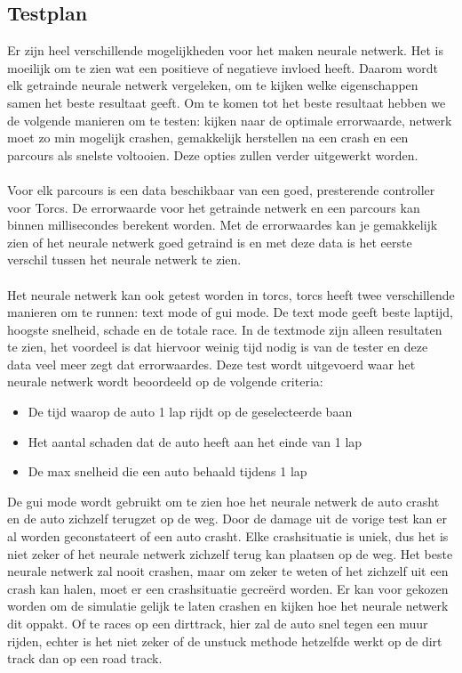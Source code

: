 \pagebreak
\subsection{Testplan}
\label{testplan}
Er zijn heel verschillende mogelijkheden voor het maken neurale netwerk. Het is moeilijk om te zien wat een positieve of negatieve invloed heeft. Daarom wordt elk getrainde neurale netwerk vergeleken, om te kijken welke eigenschappen samen het beste resultaat geeft. Om te komen tot het beste resultaat hebben we de volgende manieren om te testen: kijken naar de optimale errorwaarde, netwerk moet zo min mogelijk crashen, gemakkelijk herstellen na een crash en een parcours als snelste voltooien. Deze opties zullen verder uitgewerkt worden. \\\\
Voor elk parcours is een data beschikbaar van een goed, presterende controller voor Torcs. De errorwaarde voor het getrainde netwerk en een parcours kan binnen millisecondes berekent worden. Met de errorwaardes kan je gemakkelijk zien of het neurale netwerk goed getraind is en met deze data is het eerste verschil tussen het neurale netwerk te zien. \\\\
Het neurale netwerk kan ook getest worden in torcs, torcs heeft twee verschillende manieren om te runnen: text mode of gui mode. De text mode geeft beste laptijd, hoogste snelheid, schade en de totale race. In de textmode zijn alleen resultaten te zien, het voordeel is dat hiervoor weinig tijd nodig is van de tester en deze data veel meer zegt dat errorwaardes. Deze test wordt uitgevoerd waar het neurale netwerk wordt beoordeeld op de volgende criteria:
\begin{itemize}
\item De tijd waarop de auto 1 lap rijdt op de geselecteerde baan
\item Het aantal schaden dat de auto heeft aan het einde van 1 lap
\item De max snelheid die een auto behaald tijdens 1 lap
\end{itemize}
\noindent De gui mode wordt gebruikt om te zien hoe het neurale netwerk de auto crasht en de auto zichzelf terugzet op de weg. Door de damage uit de vorige test kan er al worden geconstateert of een auto crasht. Elke crashsituatie is uniek, dus het is niet zeker of het neurale netwerk zichzelf terug kan plaatsen op de weg. Het beste neurale netwerk zal nooit crashen, maar om zeker te weten of het zichzelf uit een crash kan halen, moet er een crashsituatie gecre\"erd worden. Er kan voor gekozen worden om de simulatie gelijk te laten crashen en kijken hoe het neurale netwerk dit oppakt. Of te races op een dirttrack, hier zal de auto snel tegen een muur rijden, echter is het niet zeker of de unstuck methode hetzelfde werkt op de dirt track dan op een road track.\\\\
